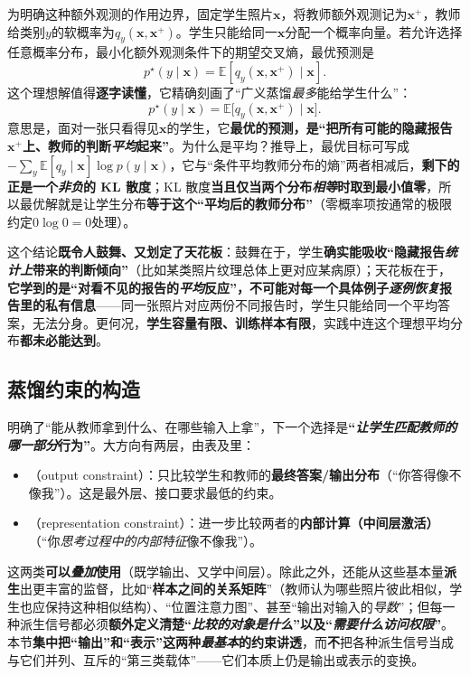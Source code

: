 为明确这种额外观测的作用边界，固定学生照片$\bm{x}$，将教师额外观测记为$\bm{x}^{+}$，教师给类别$y$的软概率为$q_y(\bm{x},\bm{x}^{+})$。学生只能给同一$\bm{x}$分配一个概率向量。若允许选择任意概率分布，最小化额外观测条件下的期望交叉熵，最优预测是
\begin{equation}
  p^\star(y\mid\bm{x})
   =\mathbb{E}\!\left[q_y(\bm{x},\bm{x}^{+})\mid\bm{x}\right].
  \label{eq:ket-integration-privileged-limit}
\end{equation}
这个理想解值得\textbf{逐字读懂}，它精确刻画了“广义蒸馏\emph{最多}能给学生什么”：
$$p^\star(y\mid\bm{x})=\mathbb{E}\bigl[q_y(\bm{x},\bm{x}^+)\mid\bm{x}\bigr].$$
意思是，面对一张只看得见$\bm{x}$的学生，它\textbf{最优的预测，是“把所有可能的隐藏报告$\bm{x}^+$上、教师的判断\emph{平均}起来”}。为什么是平均？推导上，最优目标可写成$-\sum_y\mathbb{E}[q_y\mid\bm{x}]\log p(y\mid\bm{x})$，它与“条件平均教师分布的熵”两者相减后，\textbf{剩下的正是一个\emph{非负}的 KL 散度}；KL 散度\textbf{当且仅当两个分布\emph{相等}时取到最小值零}，所以最优解就是让学生分布\textbf{等于这个“平均后的教师分布”}（零概率项按通常的极限约定$0\log0=0$处理）。

这个结论\textbf{既令人鼓舞、又划定了天花板}：鼓舞在于，学生\textbf{确实能吸收“隐藏报告\emph{统计上}带来的判断倾向”}（比如某类照片纹理总体上更对应某病原）；天花板在于，\textbf{它学到的是“对看不见的报告的\emph{平均}反应”，\textbf{不可能对每一个具体例子}\emph{逐例恢复}报告里的私有信息}——同一张照片对应两份不同报告时，学生只能给同一个平均答案，无法分身。更何况，\textbf{学生容量有限、训练样本有限}，实践中连这个理想平均分布\textbf{都未必能达到}。

\subsection{蒸馏约束的构造}
\label{sec:ket-integration-distillation-losses}

明确了“能从教师拿到什么、在哪些输入上拿”，下一个选择是\textbf{“\emph{让学生匹配教师的哪一部分}行为”}。大方向有两层，由表及里：
\begin{itemize}\item {}（output constraint）：只比较学生和教师的\textbf{最终答案/输出分布}（“你答得像不像我”）。这是最外层、接口要求最低的约束。\item {}（representation constraint）：进一步比较两者的\textbf{内部计算（中间层激活）}（“你\emph{思考过程中的内部特征}像不像我”）。\end{itemize}
这两类\textbf{可以\emph{叠加}使用}（既学输出、又学中间层）。除此之外，还能从这些基本量\textbf{派生}出更丰富的监督，比如“\textbf{样本之间的关系矩阵}”（教师认为哪些照片彼此相似，学生也应保持这种相似结构）、“位置注意力图”、甚至“输出对输入的\emph{导数}”；但每一种派生信号都必须\textbf{额外定义清楚“\emph{比较的对象是什么}”以及“\emph{需要什么访问权限}”}。本节\textbf{集中把“输出”和“表示”这两种\emph{最基本}的约束讲透}，而\textbf{不}把各种派生信号当成与它们并列、互斥的“第三类载体”——它们本质上仍是输出或表示的变换。


